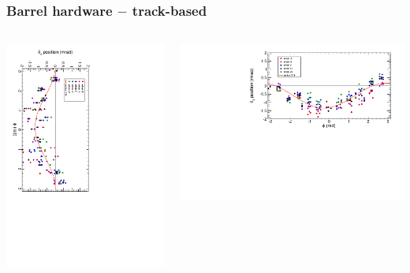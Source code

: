 \documentclass[compress]{beamer}
\begin{document}
\begin{frame}
\frametitle{Barrel hardware $-$ track-based}

\begin{columns}
\includegraphics[height=\linewidth, angle=90]{NOV4DT_vs_HARDWARE_phi.pdf}

\includegraphics[width=\linewidth]{NovHardware_vs_phi.pdf}


\end{columns}
\end{frame}
\end{document}

